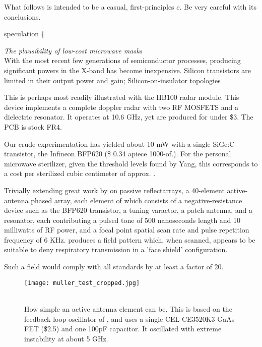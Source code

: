 \documentclass[paper.tex]{subfiles}
\begin{document}
\begin{autem}
What follows is intended to be a casual, first-principles e. Be very careful with its conclusions.
\end{autem}

{\color{red} speculation \{ } 

\clearpage
{\Large \it The plausibility of low-cost microwave masks}\\

With the most recent few generations of semiconductor processes, producing significant powers in the X-band has become inexpensive. Silicon transistors are limited in their output power and gain; Silicon-on-insulator topologies 

This is perhaps most readily illustrated with the HB100 radar module. This device implements a complete doppler radar with two RF MOSFETS and a dielectric resonator. It operates at 10.6 GHz, yet are produced for under \$3. The PCB is stock FR4.

Our crude experimentation has yielded about 10 mW with a single SiGe:C transistor, the Infineon BFP620 (\$ 0.34 apiece \@ 1000-of.). For the personal microwave sterilizer, given the threshold levels found by Yang, this corresponds to a cost per sterilized cubic centimeter of approx. \cite{BFP620H7764XTSA1}.




Trivially extending great work by \cite{Focusing} on passive reflectarrays, a 40-element active-antenna phased array, each element of which consists of a negative-resistance device such as the BFP620 transistor, a tuning varactor, a patch antenna, and a resonator, each contributing a pulsed tone of 500 nanoseconds length and 10 milliwatts of RF power, and a focal point spatial scan rate and pulse repetition frequency of 6 KHz. produces a field pattern which, when scanned, appears to be suitable to deny respiratory transmission in a 'face shield' configuration. 

Such a field would comply with all standards by at least a factor of 20.


\begin{figure}[H]
	\captionsetup{singlelinecheck = false, justification=justified}
	\centering
	\texttt{[image: muller\_test\_cropped.jpg]}
	\caption{\\ How simple an active antenna element can be. This is based on the feedback-loop oscillator of \cite{SmallSize2008}, and uses a single CEL CE3520K3 GaAs FET (\$2.5) and one 100pF capacitor. It oscillated with extreme instability at about 5 GHz.}
\end{figure}
\end{document}
